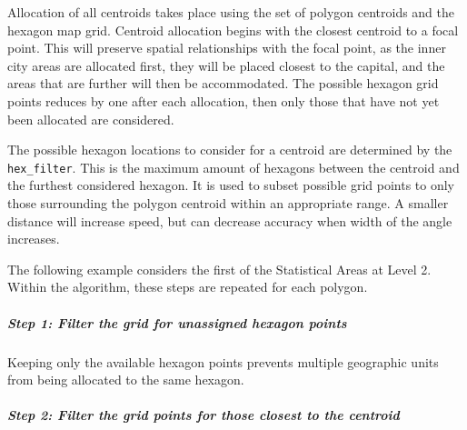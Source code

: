 \documentclass{monashthesis}
\begin{document}
Allocation of all centroids takes place using the set of polygon centroids and the hexagon map grid.
Centroid allocation begins with the closest centroid to a focal point.
This will preserve spatial relationships with the focal point, as the inner city areas are allocated first, they will be placed closest to the capital, and the areas that are further will then be accommodated.
The possible hexagon grid points reduces by one after each allocation, then only those that have not yet been allocated are considered.

The possible hexagon locations to consider for a centroid are determined by the \texttt{hex\_filter}. This is the maximum amount of hexagons between the centroid and the furthest considered hexagon. It is used to subset possible grid points to only those surrounding the polygon centroid within an appropriate range. A smaller distance will increase speed, but can decrease accuracy when width of the angle increases.

\begin{Shaded}
\end{Shaded}

The following example considers the first of the Statistical Areas at Level 2.
Within the algorithm, these steps are repeated for each polygon.

\hypertarget{step-1-filter-the-grid-for-unassigned-hexagon-points}{%
\subparagraph{Step 1: Filter the grid for unassigned hexagon points}\label{step-1-filter-the-grid-for-unassigned-hexagon-points}}

Keeping only the available hexagon points prevents multiple geographic units from being allocated to the same hexagon.

\hypertarget{step-2-filter-the-grid-points-for-those-closest-to-the-centroid}{%
\subparagraph{Step 2: Filter the grid points for those closest to the centroid}\label{step-2-filter-the-grid-points-for-those-closest-to-the-centroid}}
\end{document}
